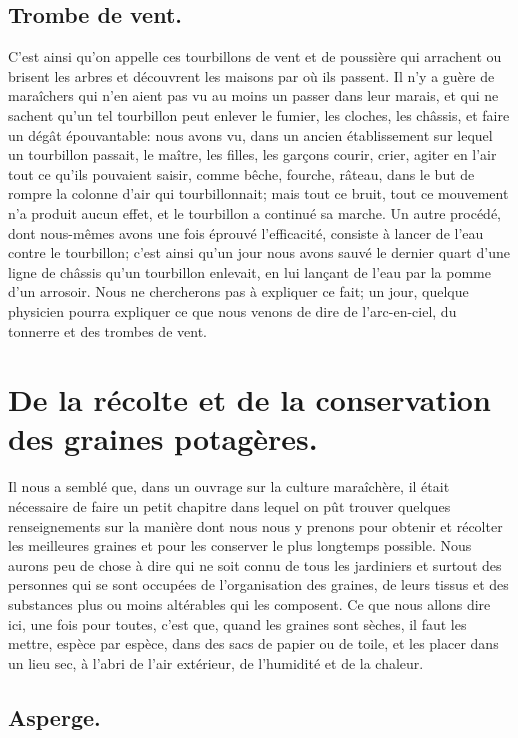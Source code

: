 \documentclass[10pt,a4paper]{book}
\begin{document}
\section{Trombe de vent.}

C'est ainsi qu'on appelle ces tourbillons de vent et de poussière qui arrachent ou brisent les arbres et découvrent les maisons par où ils passent. Il n'y a guère de maraîchers qui n'en aient pas vu au moins un passer dans leur marais, et qui ne sachent qu'un tel tourbillon peut enlever le fumier, les cloches, les châssis, et faire un dégât épouvantable: nous avons vu, dans un ancien établissement sur lequel un tourbillon passait, le maître, les filles, les garçons courir, crier, agiter en l'air tout ce qu'ils pouvaient saisir, comme bêche, fourche, râteau, dans le but de rompre la colonne d'air qui tourbillonnait; mais tout ce bruit, tout ce mouvement n'a produit aucun effet, et le tourbillon a continué sa marche. Un autre procédé, dont nous-mêmes avons une fois éprouvé l'efficacité, consiste à lancer de l'eau contre le tourbillon; c'est ainsi qu'un jour nous avons sauvé le dernier quart d'une ligne de châssis qu'un tourbillon enlevait, en lui lançant de l'eau par la pomme d'un arrosoir. Nous ne chercherons pas à expliquer ce fait; un jour, quelque physicien pourra expliquer ce que nous venons de dire de l'arc-en-ciel, du tonnerre et des trombes de vent.

\chapter{De la récolte et de la conservation des graines potagères.}

Il nous a semblé que, dans un ouvrage sur la culture maraîchère, il était nécessaire de faire un petit chapitre dans lequel on pût trouver quelques renseignements sur la manière dont nous nous y prenons pour obtenir et récolter les meilleures graines et pour les conserver le plus longtemps possible. Nous aurons peu de chose à dire qui ne soit connu de tous les jardiniers et surtout des personnes qui se sont occupées de l'organisation des graines, de leurs tissus et des substances plus ou moins altérables qui les composent. Ce que nous allons dire ici, une fois pour toutes, c'est que, quand les graines sont sèches, il faut les mettre, espèce par espèce, dans des sacs de papier ou de toile, et les placer dans un lieu sec, à l'abri de l'air extérieur, de l'humidité et de la chaleur.

\section{Asperge.}
\end{document}
